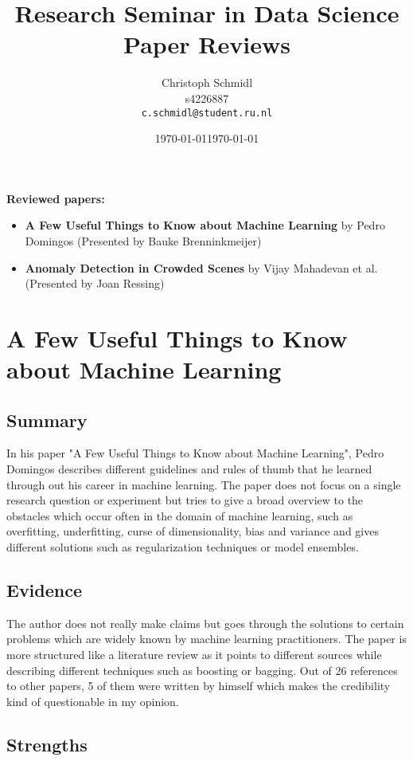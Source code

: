 \documentclass[a4paper]{article}
\title{Research Seminar in Data Science\\Paper Reviews}
\author{
  Christoph Schmidl\\ s4226887\\      \texttt{c.schmidl@student.ru.nl}
}
\date{\today}
\date{\today}
\begin{document}
\maketitle

\textbf{Reviewed papers:}

\begin{itemize}
	\item \textbf{A Few Useful Things to Know about Machine Learning} by Pedro Domingos (Presented by Bauke Brenninkmeijer)
	\item \textbf{Anomaly Detection in Crowded Scenes} by Vijay Mahadevan et al. (Presented by Joan Ressing)
\end{itemize}


\section{A Few Useful Things to Know about Machine Learning}

\subsection{Summary}

In his paper "A Few Useful Things to Know about Machine Learning", Pedro Domingos describes different guidelines and rules of thumb that he learned through out his career in machine learning. The paper does not focus on a single research question or experiment but tries to give a broad overview to the obstacles which occur often in the domain of machine learning, such as overfitting, underfitting, curse of dimensionality, bias and variance and gives different solutions such as regularization techniques or model ensembles.

\subsection{Evidence}

The author does not really make claims but goes through the solutions to certain problems which are widely known by machine learning practitioners. The paper is more structured like a literature review as it points to different sources while describing different techniques such as boosting or bagging. Out of 26 references to other papers, 5 of them were written by himself which makes the credibility kind of questionable in my opinion.

\subsection{Strengths}
\end{document}

